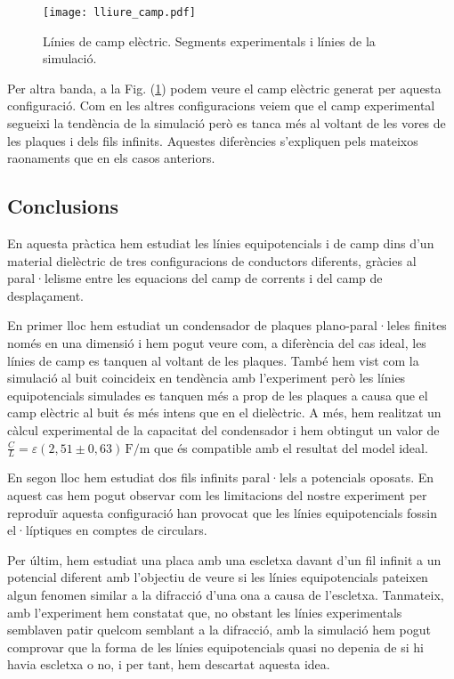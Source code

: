 \documentclass[11pt]{article}
\numberwithin{equation}{section}
\numberwithin{figure}{section}
\numberwithin{table}{section}
\begin{document}
\begin{figure}
    \centering
    \texttt{[image: lliure\_camp.pdf]}
    \caption{Línies de camp elèctric. Segments experimentals i línies de la simulació.}
    \label{fig: lliure_camp}
\end{figure}

Per altra banda, a la Fig. (\ref{fig: lliure_camp}) podem veure el camp elèctric generat per aquesta configuració. Com en les altres configuracions veiem que el camp experimental segueixi la tendència de la simulació però es tanca més al voltant de les vores de les plaques i dels fils infinits. Aquestes diferències s'expliquen pels mateixos raonaments que en els casos anteriors.


\subsection{Conclusions}\label{sec: conc}

En aquesta pràctica hem estudiat les línies equipotencials i de camp dins d'un material dielèctric de tres configuracions de conductors diferents, gràcies al paral·lelisme entre les equacions del camp de corrents i del camp de desplaçament. 

En primer lloc hem estudiat un condensador de plaques plano-paral·leles finites només en una dimensió i hem pogut veure com, a diferència del cas ideal, les línies de camp es tanquen al voltant de les plaques. També hem vist com la simulació al buit coincideix en tendència amb l'experiment però les línies equipotencials simulades es tanquen més a prop de les plaques a causa que el camp elèctric al buit és més intens que en el dielèctric. A més, hem realitzat un càlcul experimental de la capacitat del condensador i hem obtingut un valor de $ \frac{C}{L} = \varepsilon  (2{,}51 \pm 0{,}63)\, \mathrm{F/m} $ que és compatible amb el resultat del model ideal.

En segon lloc hem estudiat dos fils infinits paral·lels a potencials oposats. En aquest cas hem pogut observar com les limitacions del nostre experiment per reproduïr aquesta configuració han provocat que les línies equipotencials fossin el·líptiques en comptes de circulars.

Per últim, hem estudiat una placa amb una escletxa davant d'un fil infinit a un potencial diferent amb l'objectiu de veure si les línies equipotencials pateixen algun fenomen similar a la difracció d'una ona a causa de l'escletxa. Tanmateix, amb l'experiment hem constatat que, no obstant les línies experimentals semblaven patir quelcom semblant a la difracció, amb la simulació hem pogut comprovar que la forma de les línies equipotencials quasi no depenia de si hi havia escletxa o no, i per tant, hem descartat aquesta idea.
\end{document}
